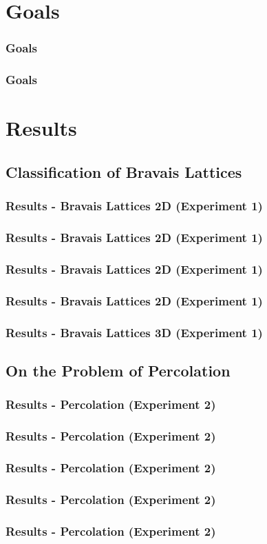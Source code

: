 \documentclass{beamer}
\begin{document}
\section{Goals}
\begin{frame}
    \frametitle{Goals}
    
\end{frame}
\begin{frame}
    \frametitle{Goals}
    
\end{frame}

\section{Results}
\subsection{Classification of Bravais Lattices}
\begin{frame}
    \frametitle{Results - Bravais Lattices 2D (Experiment 1)}
    
\end{frame}
\begin{frame}
    \frametitle{Results - Bravais Lattices 2D (Experiment 1)}
    
\end{frame}
\begin{frame}
    \frametitle{Results - Bravais Lattices 2D (Experiment 1)}
    
\end{frame}
\begin{frame}
    \frametitle{Results - Bravais Lattices 2D (Experiment 1)}
    
\end{frame}
\begin{frame}
    \frametitle{Results - Bravais Lattices 3D (Experiment 1)}
    
\end{frame}
\subsection{On the Problem of Percolation}
\begin{frame}
    \frametitle{Results - Percolation (Experiment 2)}
    
\end{frame}
\begin{frame}
    \frametitle{Results - Percolation (Experiment 2)}
    
\end{frame}
\begin{frame}
    \frametitle{Results - Percolation (Experiment 2)}
    
\end{frame}
\begin{frame}
    \frametitle{Results - Percolation (Experiment 2)}
    
\end{frame}
\begin{frame}
    \frametitle{Results - Percolation (Experiment 2)}
    
\end{frame}
\end{document}
